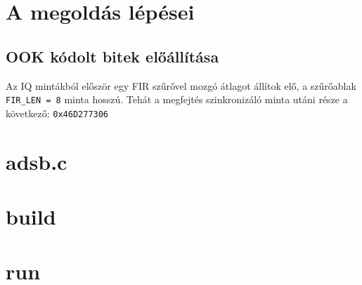 \section{A megoldás lépései}
    \subsection{OOK kódolt bitek előállítása}
        Az IQ mintákból először egy FIR szűrővel mozgó átlagot állítok elő, a szűrőablak \verb|FIR_LEN = 8| minta hosszú.
		Tehát a megfejtés szinkronizáló minta utáni része a következő: \verb|0x46D277306|


%
\clearpage
\appendix
%
\section{adsb.c}
		
\section{build}
		
\section{run}
		
%





